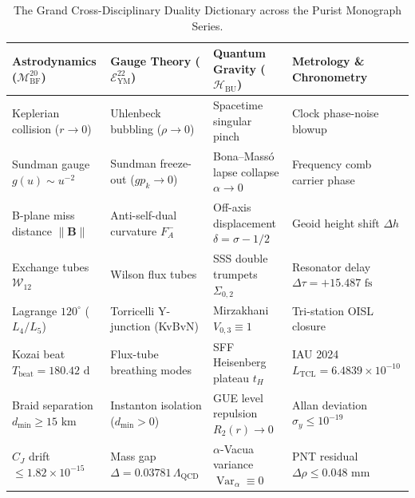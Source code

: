 \documentclass[11pt,a4paper,reqno]{article}
\theoremstyle{plain}
\theoremstyle{definition}
\theoremstyle{remark}
\numberwithin{equation}{section}
\numberwithin{table}{section}
\newcommand{\MbfTwenty}{\mathcal{M}_{\mathrm{BF}}^{20}}
\newcommand{\Eym}{\mathcal{E}_{\mathrm{YM}}^{22}}
\newcommand{\Hbu}{\mathcal{H}_{\mathrm{BU}}}
\DeclareMathOperator{\Var}{Var}
\begin{document}
\begin{table}[H]
\centering
\small
\caption{The Grand Cross-Disciplinary Duality Dictionary across the Purist Monograph Series.}
\label{tab:master_duality_dictionary}
\vspace{0.4em}
\begin{tabularx}{\textwidth}{@{}P{3.8cm} P{3.8cm} P{3.8cm} Y@{}}
\toprule
\textbf{Astrodynamics ($\MbfTwenty$)} & \textbf{Gauge Theory ($\Eym$)} & \textbf{Quantum Gravity ($\Hbu$)} & \textbf{Metrology \& Chronometry} \\
\midrule
Keplerian collision ($r \to 0$) & Uhlenbeck bubbling ($\rho \to 0$) & Spacetime singular pinch & Clock phase-noise blowup \\
Sundman gauge $g(u) \sim u^{-2}$ & Sundman freeze-out ($g p_k \to 0$) & Bona--Mass\'o lapse collapse $\alpha \to 0$ & Frequency comb carrier phase \\
B-plane miss distance $\|\bm{B}\|$ & Anti-self-dual curvature $F_A^-$ & Off-axis displacement $\delta = \sigma - 1/2$ & Geoid height shift $\Delta h$ \\
Exchange tubes $\mathcal{W}_{12}$ & Wilson flux tubes & SSS double trumpets $\Sigma_{0,2}$ & Resonator delay $\Delta\tau = +15.487\text{ fs}$ \\
Lagrange $120^\circ$ ($L_4/L_5$) & Torricelli Y-junction (KvBvN) & Mirzakhani $V_{0,3} \equiv 1$ & Tri-station OISL closure \\
Kozai beat $T_{\mathrm{beat}} = 180.42\text{ d}$ & Flux-tube breathing modes & SFF Heisenberg plateau $t_H$ & IAU 2024 $L_{\mathrm{TCL}} = 6.4839 \times 10^{-10}$ \\
Braid separation $d_{\min} \ge 15\text{ km}$ & Instanton isolation ($d_{\min} > 0$) & GUE level repulsion $R_2(r) \to 0$ & Allan deviation $\sigma_y \le 10^{-19}$ \\
$C_J$ drift $\le 1.82 \times 10^{-15}$ & Mass gap $\Delta = 0.03781\,\Lambda_{\mathrm{QCD}}$ & $\alpha$-Vacua variance $\Var_\alpha \equiv 0$ & PNT residual $\Delta\rho \le 0.048\text{ mm}$ \\
\bottomrule
\end{tabularx}
\end{table}
\end{document}
